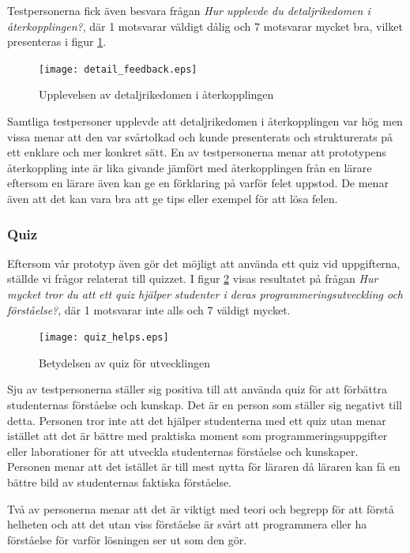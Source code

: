 \documentclass[a4paper,11pt]{article}
\begin{document}
{Testpersonerna fick även besvara frågan \textit{Hur upplevde du detaljrikedomen i återkopplingen?}, där 1 motsvarar väldigt dålig och 7 motsvarar mycket bra, vilket presenteras i figur \ref{fig:DetailFeedback}.

\begin{figure}[ht!]
\centering
\texttt{[image: detail\_feedback.eps]}
\caption{Upplevelsen av detaljrikedomen i återkopplingen}
\label{fig:DetailFeedback}
\end{figure}

Samtliga testpersoner upplevde att detaljrikedomen i återkopplingen var hög men vissa menar att den var svårtolkad och kunde presenterats och strukturerats på ett enklare och mer konkret sätt. En av testpersonerna menar att prototypens återkoppling inte är lika givande jämfört med återkopplingen från en lärare eftersom en lärare även kan ge en förklaring på varför felet uppstod. De menar även att det kan vara bra att ge tips eller exempel för att lösa felen.

\newpage
\subsubsection{Quiz}

Eftersom vår prototyp även gör det möjligt att använda ett quiz vid uppgifterna, ställde vi frågor relaterat till quizzet. I figur \ref{fig:QuizHelps} visas resultatet på frågan \textit{Hur mycket tror du att ett quiz hjälper studenter i deras programmeringsutveckling och förståelse?}, där 1 motsvarar inte alls och 7 väldigt mycket.

\begin{figure}[ht!]
\centering
\texttt{[image: quiz\_helps.eps]}
\caption{Betydelsen av quiz för utvecklingen}
\label{fig:QuizHelps}
\end{figure}

Sju av testpersonerna ställer sig positiva till att använda quiz för att förbättra studenternas förståelse och kunskap. Det är en person som ställer sig negativt till detta. Personen tror inte att det hjälper studenterna med ett quiz utan menar istället att det är bättre med praktiska moment som programmeringsuppgifter eller laborationer för att utveckla studenternas förståelse och kunskaper. Personen menar att det istället är till mest nytta för läraren då läraren kan få en bättre bild av studenternas faktiska förståelse.

Två av personerna menar att det är viktigt med teori och begrepp för att förstå helheten och att det utan viss förståelse är svårt att programmera eller ha förståelse för varför lösningen ser ut som den gör.

}
\end{document}
